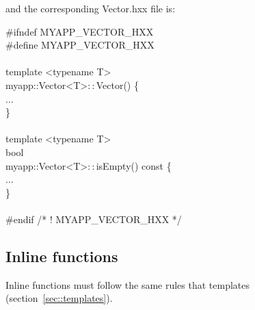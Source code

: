 and the corresponding Vector.hxx file is:
\begin{algorithm}[H]
\#ifndef MYAPP\_VECTOR\_HXX \\
\#define MYAPP\_VECTOR\_HXX \\
 \\
template <typename T> \\
myapp::Vector<T>$::$Vector() \{ \\
... \\
\} \\
 \\
template <typename T> \\
bool \\
myapp::Vector<T>$::$isEmpty() const \{ \\
... \\
\}\\
 \\
\#endif /* ! MYAPP\_VECTOR\_HXX */
\end{algorithm}

\subsection{Inline functions}
\label{sec::inline}
Inline functions must follow the same rules that templates
(section~\ref{sec::templates}).
